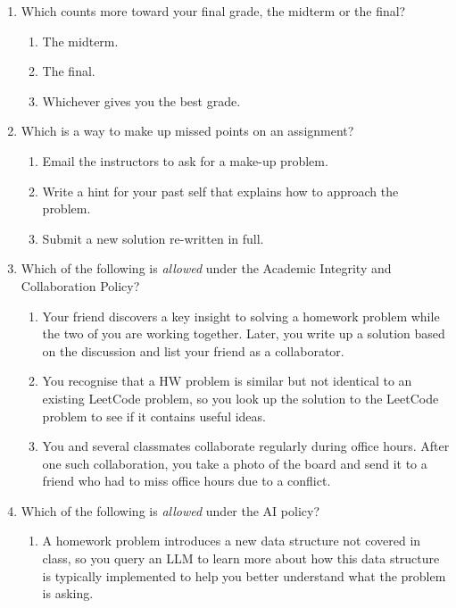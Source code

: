 \documentclass[12 pt, letterpaper]{hmcpset}
\begin{document}
\begin{problem}
	\begin{enumerate}[label = \arabic*.]
		\item Which counts more toward your final grade, the midterm or the final?
			\begin{enumerate}
				\item The midterm.
				\item The final.
				\item Whichever gives you the best grade.
			\end{enumerate}

		\item Which is a way to make up missed points on an assignment?
			\begin{enumerate}
				\item Email the instructors to ask for a make-up problem.
				\item Write a hint for your past self that explains how to approach the problem.
				\item Submit a new solution re-written in full.	
			\end{enumerate}

		\item Which of the following is \emph{allowed} under the Academic Integrity and Collaboration Policy?
			\begin{enumerate}
				\item Your friend discovers a key insight to solving a homework problem while the two of you are working together. Later, you write up a solution based on the discussion and list your friend as a collaborator.
				\item You recognise that a HW problem is similar but not identical to an existing LeetCode problem, so you look up the solution to the LeetCode problem to see if it contains useful ideas.
				\item You and several classmates collaborate regularly during office hours. After one such collaboration, you take a photo of the board and send it to a friend who had to miss office hours due to a conflict.
			\end{enumerate}

		\item Which of the following is \emph{allowed} under the AI policy?
			\begin{enumerate}
				\item A homework problem introduces a new data structure not covered in class, so you query an LLM to learn more about how this data structure is typically implemented to help you better understand what the problem is asking.


\end{enumerate}
\end{enumerate}
\end{problem}
\end{document}
